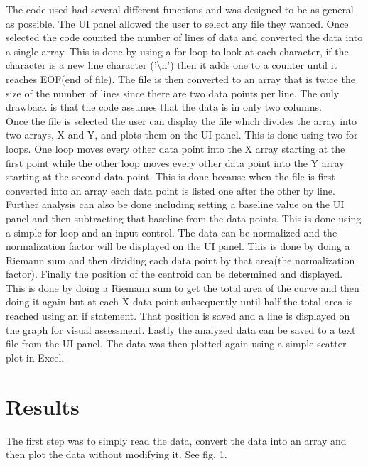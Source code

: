\documentclass{article}
\begin{document}
The code used had several different functions and was designed to be as general as possible.  The UI panel allowed the user to select any file they wanted.  Once selected the code counted the number of lines of data and converted the data into a single array.  This is done by using a for-loop to look at each character, if the character is a new line character ('\textbackslash n') then it adds one to a counter until it reaches EOF(end of file).  The file is then converted to an array that is twice the size of the number of lines since there are two data points per line.  The only drawback is that the code assumes that the data is in only two columns.
\\
Once the file is selected the user can display the file which divides the array into two arrays, X and Y, and plots them on the UI panel.  This is done using two for loops.  One loop moves every other data point into the X array starting at the first point while the other loop moves every other data point into the Y array starting at the second data point.  This is done because when the file is first converted into an array each data point is listed one after the other by line.
\\
Further analysis can also be done including setting a baseline value on the UI panel and then subtracting that baseline from the data points.  This is done using a simple for-loop and an input control.  The data can be normalized and the normalization factor will be displayed on the UI panel.  This is done by doing a Riemann sum and then dividing each data point by that area(the normalization factor).  Finally the position of the centroid can be determined and displayed.  This is done by doing a Riemann sum to get the total area of the curve and then doing it again but at each X data point subsequently until half the total area is reached using an if statement.  That position is saved and a line is displayed on the graph for visual assessment.  Lastly the analyzed data can be saved to a text file from the UI panel.  The data was then plotted again using a simple scatter plot in Excel.



\section{Results}

The first step was to simply read the data, convert the data into an array and then plot the data without modifying it.  See fig. 1.
\end{document}
